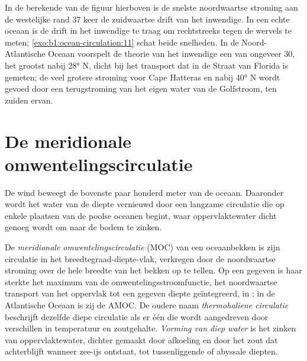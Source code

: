 In de berekende  van de figuur hierboven is de snelste noordwaartse stroming aan de westelijke rand 37 keer de zuidwaartse drift van het inwendige. In een echte oceaan is de drift in het inwendige te traag om rechtstreeks tegen de wervels te meten; \cref{exo:b1:ocean-circulation:11} schat beide snelheden. In de Noord-Atlantische Oceaan voorspelt de theorie van het inwendige een  van ongeveer \qty{30}{\sverdrup}, het grootst nabij \ang{28} N, dicht bij het transport dat in de Straat van Florida is gemeten; de veel grotere stroming voor Cape Hatteras en nabij \ang{40} N wordt gevoed door een terugstroming van het eigen water van de Golfstroom, ten zuiden ervan.

\section{De meridionale omwentelingscirculatie}\label{sec:b1:ocean-circulation:moc}

De wind beweegt de bovenste paar honderd meter van de oceaan. Daaronder wordt het water van de diepte vernieuwd door een langzame circulatie die op enkele plaatsen van de poolse oceanen begint, waar oppervlaktewater dicht genoeg wordt om naar de bodem te zinken.

\begin{definition}\label{def:b1:ocean-circulation:moc}
De \emph{meridionale omwentelingscirculatie} (MOC) van een oceaanbekken is zijn circulatie in het breedtegraad-diepte-vlak, verkregen door de noordwaartse stroming over de hele breedte van het bekken op te tellen. Op een gegeven  is haar sterkte het maximum van de omwentelingsstroomfunctie, het noordwaartse transport van het oppervlak tot een gegeven diepte geïntegreerd, in ; in de Atlantische Oceaan is zij de AMOC. De oudere naam \emph{thermohaliene circulatie} beschrijft dezelfde diepe circulatie als er één die wordt aangedreven door verschillen in temperatuur en zoutgehalte. \emph{Vorming van diep water} is het zinken van oppervlaktewater, dichter gemaakt door afkoeling en door het zout dat achterblijft wanneer zee-ijs ontstaat, tot tussenliggende of abyssale diepten.
\end{definition}

